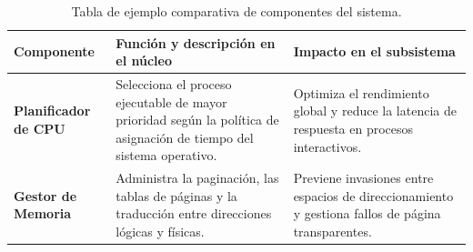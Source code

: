 \documentclass[12pt]{article}
\begin{document}
\begin{table}[htbp]
\centering
\small
\renewcommand{\arraystretch}{1.15}
\renewcommand{\tabularxcolumn}[1]{m{#1}}
\setlength{\emergencystretch}{1.5em}
\caption{Tabla de ejemplo comparativa de componentes del sistema.}
\label{tab:ejemploTabla}
\begin{tabularx}{\textwidth}{>{\centering\arraybackslash}m{3.0cm} X X}
\toprule
\textbf{Componente} & \textbf{Función y descripción en el núcleo} & \textbf{Impacto en el subsistema} \\
\midrule
\textbf{Planificador de CPU} & Selecciona el proceso ejecutable de mayor prioridad según la política de asignación de tiempo del sistema operativo. & Optimiza el rendimiento global y reduce la latencia de respuesta en procesos interactivos. \\
\addlinespace
\textbf{Gestor de Memoria} & Administra la paginación, las tablas de páginas y la traducción entre direcciones lógicas y físicas. & Previene invasiones entre espacios de direccionamiento y gestiona fallos de página transparentes. \\
\bottomrule
\end{tabularx}
\end{table}

\nocite{*}
\printbibliography[heading=bibintoc, title={Referencias}]
\end{document}
